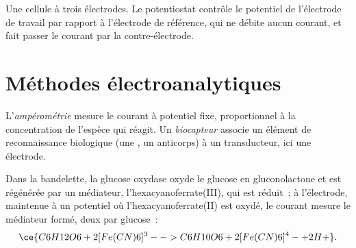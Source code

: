 \begin{omfigure}

{\small Une cellule à trois électrodes. Le potentiostat contrôle le
potentiel de l'électrode de travail par rapport à l'électrode de
référence, qui ne débite aucun courant, et fait passer le courant par la
contre-électrode.}
\end{omfigure}

\section{Méthodes électroanalytiques}

\begin{definition}\label{def:b3:electrode-kinetics:amperometry}
L'\emph{ampérométrie} mesure le courant à
potentiel fixe, proportionnel à la concentration de l'espèce qui réagit.
Un
\emph{biocapteur} associe un élément de reconnaissance
biologique (une , un anticorps) à un transducteur, ici une
électrode.
\end{definition}

Dans la bandelette, la glucose oxydase oxyde le glucose en
gluconolactone et est régénérée par un médiateur, l'hexacyanoferrate(III),
qui est réduit~; à l'électrode, maintenue à un potentiel où
l'hexacyanoferrate(II) est oxydé, le courant mesure le médiateur formé,
deux par glucose~:
\[
  \ce{C6H12O6 + 2 [Fe(CN)6]^3- -> C6H10O6 + 2 [Fe(CN)6]^4- + 2 H+} .
\]

